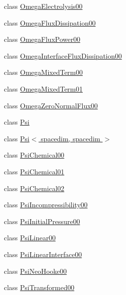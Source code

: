 \begin{DoxyCompactItemize}
class \hyperlink{classincremental_f_e_1_1_omega_electrolysis00}{Omega\+Electrolysis00}
\item 
class \hyperlink{classincremental_f_e_1_1_omega_flux_dissipation00}{Omega\+Flux\+Dissipation00}
\item 
class \hyperlink{classincremental_f_e_1_1_omega_flux_power00}{Omega\+Flux\+Power00}
\item 
class \hyperlink{classincremental_f_e_1_1_omega_interface_flux_dissipation00}{Omega\+Interface\+Flux\+Dissipation00}
\item 
class \hyperlink{classincremental_f_e_1_1_omega_mixed_term00}{Omega\+Mixed\+Term00}
\item 
class \hyperlink{classincremental_f_e_1_1_omega_mixed_term01}{Omega\+Mixed\+Term01}
\item 
class \hyperlink{classincremental_f_e_1_1_omega_zero_normal_flux00}{Omega\+Zero\+Normal\+Flux00}
\item 
class \hyperlink{classincremental_f_e_1_1_psi}{Psi}
\item 
class \hyperlink{classincremental_f_e_1_1_psi_3_01spacedim_00_01spacedim_01_4}{Psi$<$ spacedim, spacedim $>$}
\item 
class \hyperlink{classincremental_f_e_1_1_psi_chemical00}{Psi\+Chemical00}
\item 
class \hyperlink{classincremental_f_e_1_1_psi_chemical01}{Psi\+Chemical01}
\item 
class \hyperlink{classincremental_f_e_1_1_psi_chemical02}{Psi\+Chemical02}
\item 
class \hyperlink{classincremental_f_e_1_1_psi_incompressibility00}{Psi\+Incompressibility00}
\item 
class \hyperlink{classincremental_f_e_1_1_psi_initial_pressure00}{Psi\+Initial\+Pressure00}
\item 
class \hyperlink{classincremental_f_e_1_1_psi_linear00}{Psi\+Linear00}
\item 
class \hyperlink{classincremental_f_e_1_1_psi_linear_interface00}{Psi\+Linear\+Interface00}
\item 
class \hyperlink{classincremental_f_e_1_1_psi_neo_hooke00}{Psi\+Neo\+Hooke00}
\item 
class \hyperlink{classincremental_f_e_1_1_psi_transformed00}{Psi\+Transformed00}
\end{DoxyCompactItemize}
